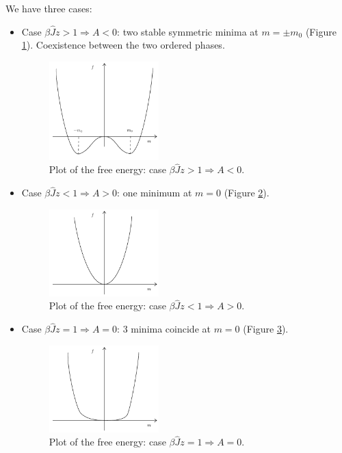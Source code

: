 \documentclass[../main/main.tex]{subfiles}
\begin{document}
We have three cases:

\begin{itemize}
\item Case \( \beta \hat{J} z > 1 \Rightarrow A<0 \): two stable symmetric minima at \( m= \pm m_0 \) (Figure \ref{fig:11_2}). Coexistence between the two ordered phases.
\begin{figure}[h!]
\centering
\includegraphics[width=0.4\textwidth]{../lessons/11_image/2.pdf}
\caption{\label{fig:11_2} Plot of the free energy: case \( \beta \hat{J} z > 1 \Rightarrow A<0 \).}
\end{figure}

\item Case \( \beta \hat{J} z < 1 \Rightarrow A>0 \): one minimum at \( m=0 \) (Figure \ref{fig:11_3}).
\begin{figure}[h!]
\centering
\includegraphics[width=0.4\textwidth]{../lessons/11_image/3.pdf}
\caption{\label{fig:11_3} Plot of the free energy: case \( \beta \hat{J} z < 1 \Rightarrow A>0 \).}
\end{figure}

\item Case \( \beta \hat{J} z = 1 \Rightarrow A=0 \): 3 minima coincide at \( m=0 \) (Figure \ref{fig:11_4}).
\begin{figure}[h!]
\centering
\includegraphics[width=0.4\textwidth]{../lessons/11_image/4.pdf}
\caption{\label{fig:11_4} Plot of the free energy: case \( \beta \hat{J} z = 1 \Rightarrow A=0 \).}
\end{figure}
\end{itemize}
\end{document}
